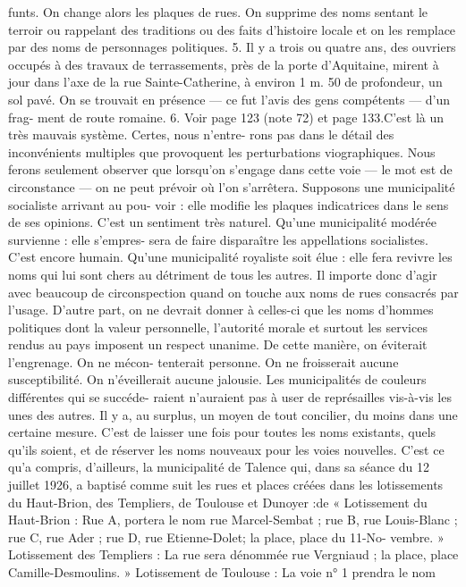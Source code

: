 \documentclass[a4paper,11pt]{book}
\begin{document}
funts. On change alors les plaques de rues. On supprime
des noms sentant le terroir ou rappelant des traditions ou
des faits d'histoire locale et on les remplace par des noms
de personnages politiques.
5. Il y a trois ou quatre ans, des ouvriers occupés à des travaux de
terrassements, près de la porte d'Aquitaine, mirent à jour dans l'axe de la
rue Sainte-Catherine, à environ 1 m. 50 de profondeur, un sol pavé. On
se trouvait en présence — ce fut l'avis des gens compétents — d'un frag-
ment de route romaine.
6. Voir page 123 (note 72) et page 133.C'est là un très mauvais système. Certes, nous n'entre-
rons pas dans le détail des inconvénients multiples que
provoquent les perturbations viographiques. Nous ferons
seulement observer que lorsqu'on s'engage dans cette voie
— le mot est de circonstance — on ne peut prévoir où l'on
s'arrêtera.
Supposons une municipalité socialiste arrivant au pou-
voir : elle modifie les plaques indicatrices dans le sens de ses
opinions. C'est un sentiment très naturel.
Qu'une municipalité modérée survienne : elle s'empres-
sera de faire disparaître les appellations socialistes. C'est
encore humain.
Qu'une municipalité royaliste soit élue : elle fera revivre
les noms qui lui sont chers au détriment de tous les autres.
Il importe donc d'agir avec beaucoup de circonspection
quand on touche aux noms de rues consacrés par l'usage.
D'autre part, on ne devrait donner à celles-ci que les noms
d'hommes politiques dont la valeur personnelle, l'autorité
morale et surtout les services rendus au pays imposent un
respect unanime.
De cette manière, on éviterait l'engrenage. On ne mécon-
tenterait personne. On ne froisserait aucune susceptibilité.
On n'éveillerait aucune jalousie.
Les municipalités de couleurs différentes qui se succéde-
raient n'auraient pas à user de représailles vis-à-vis les
unes des autres.
Il y a, au surplus, un moyen de tout concilier, du moins
dans une certaine mesure. C'est de laisser une fois pour
toutes les noms existants, quels qu'ils soient, et de réserver
les noms nouveaux pour les voies nouvelles. C'est ce qu'a
compris, d'ailleurs, la municipalité de Talence qui, dans sa
séance du 12 juillet 1926, a baptisé comme suit les rues et
places créées dans les lotissements du Haut-Brion, des
Templiers, de Toulouse et Dunoyer :de
« Lotissement du Haut-Brion : Rue A, portera le nom
rue Marcel-Sembat ; rue B, rue Louis-Blanc ; rue C, rue
Ader ; rue D, rue Etienne-Dolet; la place, place du 11-No-
vembre.
» Lotissement des Templiers : La rue sera dénommée
rue Vergniaud ; la place, place Camille-Desmoulins.
» Lotissement de Toulouse : La voie n° 1 prendra le nom
\end{document}
